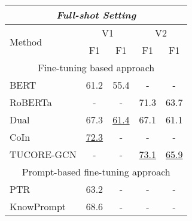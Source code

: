 \documentclass[11pt]{article}
\begin{document}
\begin{table*}[ht]
\centering
\scalebox{0.825} {
\begin{tabular}{lcccc}
\toprule
\multicolumn{5}{c}{\textit{Full-shot Setting}}                                                                                                                   \\ \midrule
\multicolumn{1}{l|}{\multirow{2}{*}{Method}} & \multicolumn{2}{c|}{V1}                             & \multicolumn{2}{c}{V2}                             \\
\cline{2-5}
\multicolumn{1}{l|}{}                        & \multicolumn{1}{c}{F1} & \multicolumn{1}{c|}{F1} & \multicolumn{1}{c}{F1} & \multicolumn{1}{c}{F1} \\ \midrule
\multicolumn{5}{c}{Fine-tuning based approach}                                                                                                          \\ \midrule
\multicolumn{1}{l|}{BERT \citep{yu-etal-2020-dialogue}}                       & \multicolumn{1}{c}{61.2} & \multicolumn{1}{c|}{55.4} & \multicolumn{1}{c}{-} & \multicolumn{1}{c}{-}                 \\
\multicolumn{1}{l|}{RoBERTa \citep{lee-choi-2021-graph}}                       & - & \multicolumn{1}{c|}{-}  & 71.3                        & 63.7 \\
\multicolumn{1}{l|}{Dual \citep{bai-etal-2021-semantic}}          & 67.3  & \multicolumn{1}{c|}{\underline{61.4}} & 67.1 & 61.1 \\
\multicolumn{1}{l|}{CoIn \citep{ijcai2021-535}}                       & \multicolumn{1}{c}{\underline{72.3}}  & \multicolumn{1}{c|}{-}  & -   &   -               \\
\multicolumn{1}{l|}{TUCORE-GCN \citep{lee-choi-2021-graph}}                       & \multicolumn{1}{c}{-} & \multicolumn{1}{c|}{-}  & \underline{73.1}  & \underline{65.9} \\ \midrule
\multicolumn{5}{c}{Prompt-based fine-tuning approach}                                                                                                   \\ \midrule
\multicolumn{1}{l|}{PTR \citep{han2021ptr}}                       & \multicolumn{1}{c}{63.2} & \multicolumn{1}{c|}{-}      & - & - \\
\multicolumn{1}{l|}{KnowPrompt \citep{chen2021knowprompt}}                       &   \multicolumn{1}{c}{68.6} & \multicolumn{1}{c|}{-}      & \multicolumn{1}{c}{-}  & \multicolumn{1}{c}{-}                       \\

\end{tabular}}
\end{table*}
\end{document}
